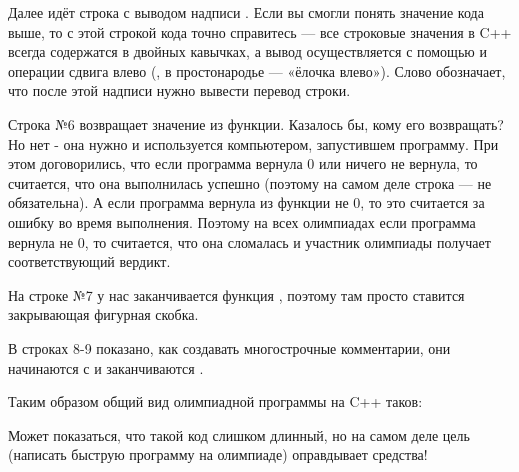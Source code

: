 Далее идёт строка с выводом надписи . Если вы смогли понять значение кода выше, то с этой строкой кода точно справитесь — все строковые значения в C++ всегда содержатся в двойных кавычках, а вывод осуществляется с помощью  и операции сдвига влево (\lcpp{<<}, в простонародье — «ёлочка влево»). Слово  обозначает, что после этой надписи нужно вывести перевод строки.

Строка №6 возвращает значение из функции. Казалось бы, кому его возвращать? Но нет - она нужно и используется компьютером, запустившем программу. При этом договорились, что если программа вернула 0 или ничего не вернула, то считается, что она выполнилась успешно (поэтому на самом деле строка  — не обязательна). А если программа вернула из функции  не 0, то это считается за ошибку во время выполнения. Поэтому на всех олимпиадах если программа вернула не 0, то считается, что она сломалась и участник олимпиады получает соответствующий вердикт.

На строке №7 у нас заканчивается функция , поэтому там просто ставится закрывающая фигурная скобка.

В строках 8-9 показано, как создавать многострочные комментарии, они начинаются с \lcpp{/*} и заканчиваются \lcpp{*/}.

Таким образом общий вид олимпиадной программы на C++ таков:


Может показаться, что такой код слишком длинный, но на самом деле цель (написать быструю программу на олимпиаде) оправдывает средства!
